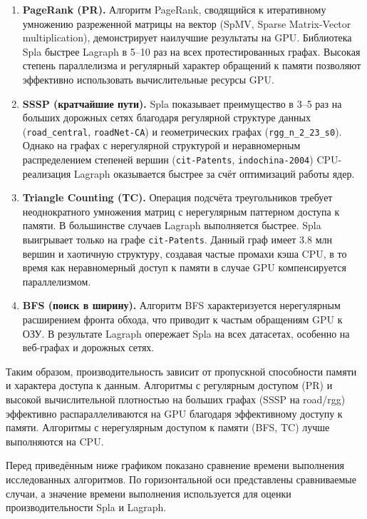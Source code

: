 \documentclass[a4paper]{article}
\begin{document}
	\begin{enumerate}
		\item \textbf{PageRank (PR).} Алгоритм PageRank, сводящийся к итеративному умножению разреженной матрицы на вектор (SpMV, Sparse Matrix-Vector multiplication), демонстрирует наилучшие результаты на GPU. Библиотека Spla быстрее Lagraph в 5--10 раз на всех протестированных графах. Высокая степень параллелизма и регулярный характер обращений к памяти позволяют эффективно использовать вычислительные ресурсы GPU.
		
		\item \textbf{SSSP (кратчайшие пути).} Spla показывает преимущество в 3--5 раз на больших дорожных сетях благодаря регулярной структуре данных (\texttt{road\_central}, \texttt{roadNet-CA}) и геометрических графах (\texttt{rgg\_n\_2\_23\_s0}). Однако на графах с нерегулярной структурой и неравномерным распределением степеней вершин (\texttt{cit-Patents}, \texttt{indochina-2004}) CPU-реализация Lagraph оказывается быстрее за счёт оптимизаций работы ядер.
		
		\item \textbf{Triangle Counting (TC).} Операция подсчёта треугольников требует неоднократного умножения матриц с нерегулярным паттерном доступа к памяти. В большинстве случаев Lagraph выполняется быстрее. Spla выигрывает только на графе \texttt{cit-Patents}. Данный граф имеет 3.8 млн вершин и хаотичную структуру, создавая частые промахи кэша CPU, в то время как неравномерный доступ к памяти в случае GPU компенсируется параллелизмом.
		
		\item \textbf{BFS (поиск в ширину).} Алгоритм BFS характеризуется нерегулярным расширением фронта обхода, что приводит к частым обращениям GPU к ОЗУ. В результате Lagraph опережает Spla на всех датасетах, особенно на веб-графах и дорожных сетях.
	\end{enumerate}
	
	Таким образом, производительность зависит от пропускной способности памяти и характера доступа к данным. Алгоритмы с регулярным доступом (PR) и высокой вычислительной плотностью на больших графах (SSSP на road/rgg) эффективно распараллеливаются на GPU благодаря эффективному доступу к памяти. Алгоритмы с нерегулярным доступом к памяти (BFS, TC) лучше выполняются на CPU.
	
	Перед приведённым ниже графиком показано сравнение времени выполнения исследованных алгоритмов. По горизонтальной оси представлены сравниваемые случаи, а значение времени выполнения используется для оценки производительности Spla и Lagraph.
	
\end{document}
